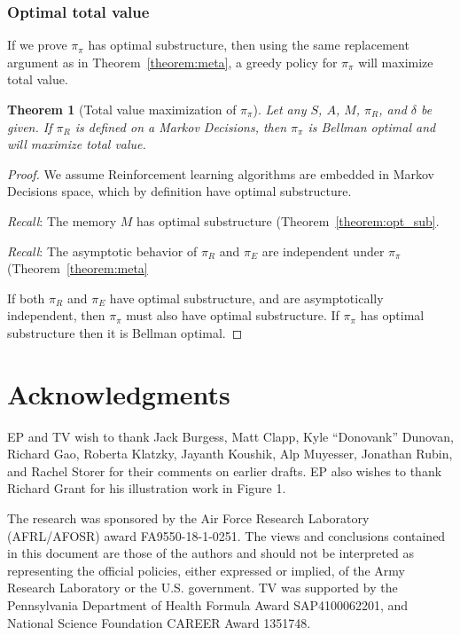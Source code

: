 \documentclass[9pt,lineno]{elife}
\newtheorem{theorem}{Theorem}
\begin{document}
\subsubsection*{Optimal total value}
If we prove $\pi_{\pi}$ has optimal substructure, then using the same replacement argument \citep{Roughgarden2019} as in Theorem~\ref{theorem:meta}, a greedy policy for $\pi_\pi$ will maximize total value.

\begin{theorem}[Total value maximization of $\pi_{\pi}$] \label{theorem:meta_total} 
    \label{theorem:meta} 
	 Let any $S$, $A$, $M$, $\pi_R$, and $\delta$ be given. If $\pi_R$ is defined on a Markov Decisions, then $\pi_\pi$ is Bellman optimal and will maximize total value. 
\end{theorem}
\begin{proof}
    We assume Reinforcement learning algorithms are embedded in Markov Decisions space, which by definition have optimal substructure.
    
    \textit{Recall}: The memory $M$ has optimal substructure (Theorem~\ref{theorem:opt_sub}.
    
    \textit{Recall}: The asymptotic behavior of $\pi_R$ and $\pi_E$ are independent under $\pi_\pi$ (Theorem~\ref{theorem:meta}
	
	If both $\pi_R$ and $\pi_E$ have optimal substructure, and are asymptotically independent, then $\pi_\pi$ must also have optimal substructure. If $\pi_\pi$ has optimal substructure then it is Bellman optimal.
\end{proof}

\section{Acknowledgments}
EP and TV wish to thank Jack Burgess, Matt Clapp, Kyle ``Donovank'' Dunovan, Richard Gao, Roberta Klatzky, Jayanth Koushik, Alp Muyesser, Jonathan Rubin, and Rachel Storer for their comments on earlier drafts. EP also wishes to thank Richard Grant for his illustration work in Figure 1.

The research was sponsored by the Air Force Research Laboratory (AFRL/AFOSR) award FA9550-18-1-0251. The views and conclusions contained in this document are those of the authors and should not be interpreted as representing the official policies, either expressed or implied, of the Army Research Laboratory or the U.S. government. TV was supported by the Pennsylvania Department of Health Formula Award SAP4100062201, and National Science Foundation CAREER Award 1351748.
\end{document}
